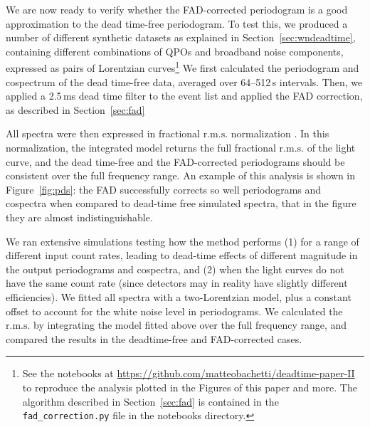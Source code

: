 \documentclass[twocolumn]{aastex61}
\newcommand{\rms}{\ensuremath{\mathrm{r.m.s.}}\xspace}
\begin{document}
\begin{figure*}
    \caption{Periodogram, in fractional \rms normalization, from a simulation with four Lorentzian features (at 50, 200, 300 and 400 Hz) with 40-Hz full with at half maximum (FWHM). 
    We plotted and fitted the periodograms obtained before and after applying a 2.5\,ms dead time filter
    The total \rms before dead time was 30\% and the incident photon flux 400 ct/s. 
    There is no significant difference between the FAD-normalized and the deadtime-free periodogram, while the cospectrum without FAD (pink) clearly distorts the curves at different frequencies.
    }
    \label{fig:pds}
\end{figure*}

We are now ready to verify whether the FAD-corrected periodogram is a good approximation to the dead time-free periodogram.
To test this, we produced a number of different synthetic datasets as explained in Section~\ref{sec:wndeadtime}, containing different combinations of QPOs and broadband noise components, expressed as pairs of Lorentzian curves\footnote{See the notebooks at \href{https://github.com/matteobachetti/deadtime-paper-II}{https://github.com/matteobachetti/deadtime-paper-II} to reproduce the analysis plotted in the Figures of this paper and more. The algorithm described in Section~\ref{sec:fad} is contained in the \texttt{fad\_correction.py} file in the notebooks directory.}
We first calculated the periodogram and cospectrum of the dead time-free data, averaged over 64--512\,s intervals.
Then, we applied a 2.5\,ms dead time filter to the event list and applied the FAD correction, as described in Section~\ref{sec:fad}

All spectra were then expressed in fractional \rms normalization \citep{Miyamoto+91,BelloniHasinger90}.
In this normalization, the integrated model returns the full fractional \rms of the light curve, and the dead time-free and the FAD-corrected periodograms should be consistent over the full frequency range.
An example of this analysis is shown in Figure~\ref{fig:pds}: the FAD successfully corrects so well periodograms and cospectra when compared to dead-time free simulated spectra, that in the figure they are almost indistinguishable.

We ran extensive simulations testing how the method performs (1) for a range of different input count rates, leading to dead-time effects of different magnitude in the output periodograms and cospectra, and (2) when the light curves do not have the same count rate (since detectors may in reality have slightly different efficiencies).
We fitted all spectra with a two-Lorentzian model, plus a constant offset to account for the white noise level in periodograms.
We calculated the \rms by integrating the model fitted above over the full frequency range, and compared the results in the deadtime-free and FAD-corrected cases.
\end{document}
